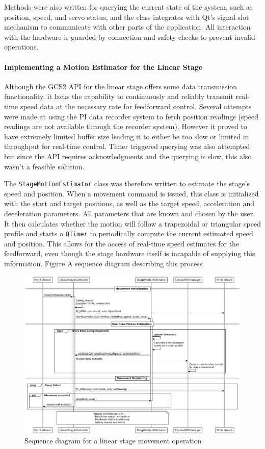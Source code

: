 Methods were also written for querying the current state of the system, such as position, speed, and servo status, and the class integrates with Qt’s signal-slot mechanism to communicate with other parts of the application. All interaction with the hardware is guarded by connection and safety checks to prevent invalid operations.


\paragraph*{Implementing a Motion Estimator for the Linear Stage}
Although the GCS2 API for the linear stage offers some data transmission functionality, it lacks the capability to continuously and reliably transmit real-time speed data at the necessary rate for feedforward control. Several attempts were made at using the PI data recorder system to fetch position readings (speed readings are not available through the recorder system). However it proved to have extremely limited buffer size leading it to either be too slow or limited in throughput for real-time control. Timer triggered querying was also attempted but since the API requires acknowledgments and the querying is slow, this also wasn't a feasible solution.

The \texttt{StageMotionEstimator} class was therefore written to estimate the stage's speed and position. When a movement command is issued, this class is initialized with the start and target positions, as well as the target speed, acceleration and deceleration parameters. All parameters that are known and chosen by the user. It then calculates whether the motion will follow a trapezoidal or triangular speed profile and starts a \texttt{QTimer} to periodically compute the current estimated speed and position. This allows for the access of real-time speed estimates for the feedforward, even though the stage hardware itself is incapable of supplying this information. Figure A sequence diagram describing this process

\begin{figure} [H]
    \centering
    \includegraphics[width=\linewidth]{images/linearstage/movetopos_sequencediag.png}
    \caption{Sequence diagram for a linear stage movement operation}
    \label{fig:movetopos}
\end{figure}



